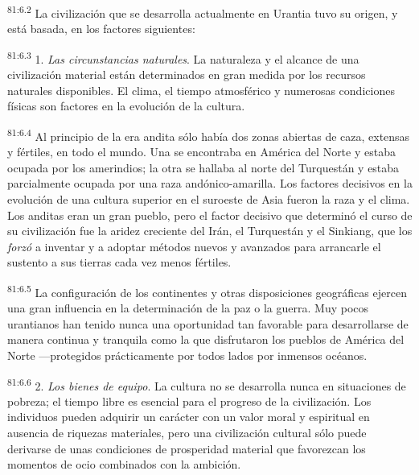 \par
\textsuperscript{81:6.2} La civilización que se desarrolla actualmente en Urantia tuvo su origen, y está basada, en los factores siguientes:

\par
\textsuperscript{81:6.3} 1. \textit{Las circunstancias naturales}. La naturaleza y el alcance de una civilización material están determinados en gran medida por los recursos naturales disponibles. El clima, el tiempo atmosférico y numerosas condiciones físicas son factores en la evolución de la cultura.

\par
\textsuperscript{81:6.4} Al principio de la era andita sólo había dos zonas abiertas de caza, extensas y fértiles, en todo el mundo. Una se encontraba en América del Norte y estaba ocupada por los amerindios; la otra se hallaba al norte del Turquestán y estaba parcialmente ocupada por una raza andónico-amarilla. Los factores decisivos en la evolución de una cultura superior en el suroeste de Asia fueron la raza y el clima. Los anditas eran un gran pueblo, pero el factor decisivo que determinó el curso de su civilización fue la aridez creciente del Irán, el Turquestán y el Sinkiang, que los \textit{forzó} a inventar y a adoptar métodos nuevos y avanzados para arrancarle el sustento a sus tierras cada vez menos fértiles.

\par
\textsuperscript{81:6.5} La configuración de los continentes y otras disposiciones geográficas ejercen una gran influencia en la determinación de la paz o la guerra. Muy pocos urantianos han tenido nunca una oportunidad tan favorable para desarrollarse de manera continua y tranquila como la que disfrutaron los pueblos de América del Norte ---protegidos prácticamente por todos lados por inmensos océanos.

\par
\textsuperscript{81:6.6} 2. \textit{Los bienes de equipo}. La cultura no se desarrolla nunca en situaciones de pobreza; el tiempo libre es esencial para el progreso de la civilización. Los individuos pueden adquirir un carácter con un valor moral y espiritual en ausencia de riquezas materiales, pero una civilización cultural sólo puede derivarse de unas condiciones de prosperidad material que favorezcan los momentos de ocio combinados con la ambición.

